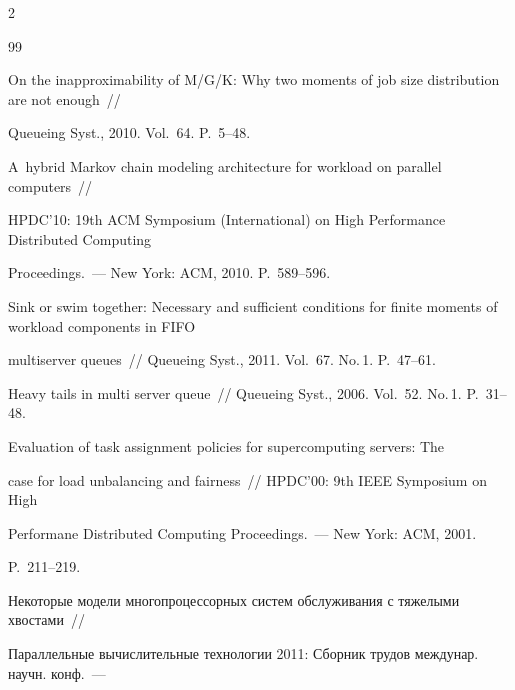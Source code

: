 \begin{multicols}{2}
{{\begin{thebibliography}{99}


On the inapproximability of M/G/K: Why two moments of job size distribution are not enough~// 

Queueing Syst., 2010. Vol.~64. P.~5--48.





A~hybrid Markov chain modeling architecture for workload on parallel computers~// 

HPDC'10: 19th ACM  Symposium (International) on High Performance Distributed Computing

Proceedings.~--- New York: ACM, 2010. P.~589--596.





Sink or swim together: Necessary and sufficient conditions for finite moments of workload components in FIFO 

multiserver queues~// Queueing Syst., 2011. Vol.~67. No.\,1. P.~47--61.





Heavy tails in multi server queue~// Queueing Syst., 2006. Vol.~52. No.\,1. P.~31--48.





Evaluation of task assignment policies for supercomputing servers: The 

case for load unbalancing and fairness~// HPDC'00: 9th IEEE Symposium on High 

Performane Distributed Computing Proceedings.~--- New York: ACM, 2001.

P.~211--219.





Некоторые модели многопроцессорных систем обслуживания с тяжелыми хвостами~// 

Параллельные вычислительные технологии 2011: Сборник трудов междунар. научн. конф.~--- 


\end{thebibliography}}}
\end{multicols}
